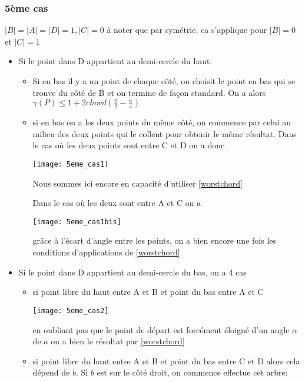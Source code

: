 \subsubsection*{5ème cas} $|B| = |A| = |D| = 1, |C| = 0$
à noter que par symétrie, ca s'applique pour $|B| = 0$ et $|C| = 1$

\begin{itemize}

\item Si le point dans D appartient au demi-cercle du haut:

\begin{itemize}

\item Si en bas il y a un point de chaque côté, on choisit le point en bas qui se trouve du côté de B et on termine de façon standard. On a alors $\gamma(P) \leq 1 + 2chord(\frac{\pi}{2} - \frac{\alpha}{4})$

\item si en bas on a les deux points du même côté, on commence par celui au milieu des deux points qui le collent pour obtenir le même résultat.
Dans le cas où les deux points sont entre C et D on a donc

\texttt{[image: 5eme\_cas1]}

Nous sommes ici encore en capacité d'utiliser \ref{worstchord}

Dans le cas où les deux sont entre A et C on a

\texttt{[image: 5eme\_cas1bis]}

grâce à l'écart d'angle entre les points, on a bien encore une fois les conditions d'applications de \ref{worstchord}

\end{itemize}

\item Si le point dans D appartient au demi-cercle du bas, on a 4 cas

\begin{itemize}

\item si point libre du haut entre A et B et point du bas entre A et C

\texttt{[image: 5eme\_cas2]}

en oubliant pas que le point de départ est forcément éloigné d'un angle $\alpha$ de $a$ on a bien le résultat par \ref{worstchord}

\item si point libre du haut entre A et B et point du bas entre C et D alors cela dépend de $b$. Si $b$ est sur le côté droit, on commence effectue cet arbre:


\end{itemize}
\end{itemize}
